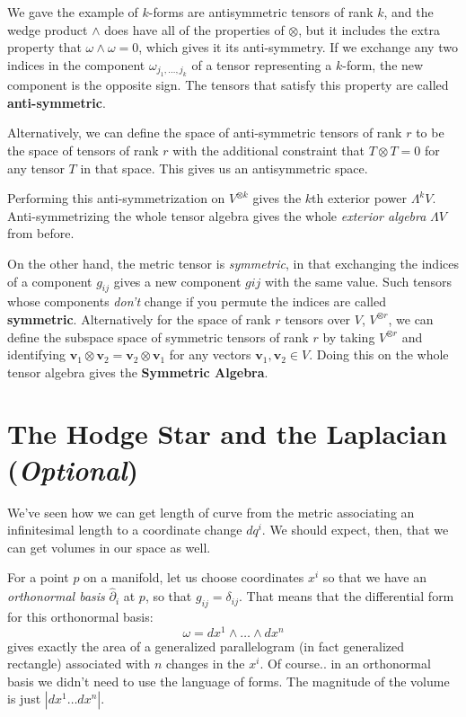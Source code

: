 	We gave the example of $k$-forms are antisymmetric tensors of rank $k$, and the wedge product $\wedge$ does have all of the properties of $\otimes$, but it includes the extra property that $\omega \wedge \omega = 0$, which gives it its anti-symmetry. If we exchange any two indices in the component $\omega_{j_1, \dots, j_k}$ of a tensor representing a $k$-form, the new component is the opposite sign. The tensors that satisfy this property are called \textbf{anti-symmetric}. 
	
	Alternatively, we can define the space of anti-symmetric tensors of rank $r$ to be the space of tensors of rank $r$ with the additional constraint that $T \otimes T = 0$ for any tensor $T$ in that space. This gives us an antisymmetric space. 
	
	Performing this anti-symmetrization on $V^{\otimes k}$ gives the $k$th exterior power $\Lambda^k V$. Anti-symmetrizing the whole tensor algebra gives the whole \emph{exterior algebra} $\Lambda V$ from before. 
	
	On the other hand, the metric tensor is \emph{symmetric}, in that exchanging the indices of a component $g_{ij}$ gives a new component $g{ij}$ with the same value. Such tensors whose components \emph{don't} change if you permute the indices are called \textbf{symmetric}. Alternatively for the space of rank $r$ tensors over $V$, $V^{\otimes r}$, we can define the subspace space of symmetric tensors of rank $r$ by taking $V^{\otimes r}$ and identifying $\mathbf v_1 \otimes \mathbf v_2 = \mathbf v_2 \otimes \mathbf v_1$ for any vectors $\mathbf v_1, \mathbf v_2 \in V$. Doing this on the whole tensor algebra gives the \textbf{Symmetric Algebra}.
	

	\section{The Hodge Star and the Laplacian (\emph{Optional})} %
	\label{sec:the_hodge_star_and_the_laplacian}
	
	We've seen how we can get length of curve from the metric associating an infinitesimal length to a coordinate change $dq^i$. We should expect, then, that we can get volumes in our space as well.  
	
	For a point $p$ on a manifold, let us choose coordinates $x^i$ so that we have an \emph{orthonormal basis} $\hat \partial_i$ at $p$, so that $g_{ij} = \delta_{ij}$. That means that the differential form for this orthonormal basis:
	\begin{equation}
		\omega = dx^1 \wedge \dots \wedge dx^n
	\end{equation}
	gives exactly the area of a generalized parallelogram (in fact generalized rectangle) associated with $n$ changes in the $x^i$. Of course.. in an orthonormal basis we didn't need to use the language of forms. The magnitude of the volume is just $|dx^1 \dots dx^n|$.
	
